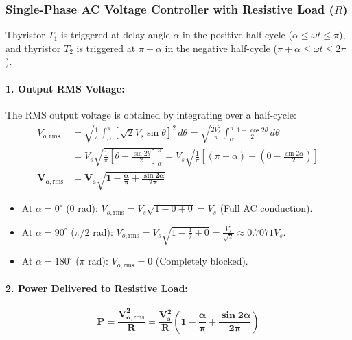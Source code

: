 \subsubsection{Single-Phase AC Voltage Controller with Resistive Load ($R$)}
Thyristor $T_1$ is triggered at delay angle $\alpha$ in the positive half-cycle ($\alpha \le \omega t \le \pi$), and thyristor $T_2$ is triggered at $\pi + \alpha$ in the negative half-cycle ($\pi + \alpha \le \omega t \le 2\pi$).

\paragraph{1. Output RMS Voltage:}
The RMS output voltage is obtained by integrating over a half-cycle:
\begin{align}
V_{o,\mathrm{rms}} &= \sqrt{\frac{1}{\pi} \int_\alpha^\pi \left[\sqrt{2} V_s \sin\theta\right]^2\,d\theta} = \sqrt{\frac{2 V_s^2}{\pi} \int_\alpha^\pi \frac{1 - \cos 2\theta}{2}\,d\theta} \nonumber \\
&= V_s \sqrt{\frac{1}{\pi} \left[ \theta - \frac{\sin 2\theta}{2} \right]_\alpha^\pi} = V_s \sqrt{\frac{1}{\pi} \left[ (\pi - \alpha) - \left(0 - \frac{\sin 2\alpha}{2}\right) \right]} \nonumber \\
\label{eq:ac_ac_vrms}
\mathbf{V_{o,\mathrm{rms}}} &\mathbf{= V_s \sqrt{1 - \frac{\alpha}{\pi} + \frac{\sin 2\alpha}{2\pi}}}
\end{align}
\begin{itemize}
  \item At $\alpha = 0^\circ$ ($0$ rad): $V_{o,\mathrm{rms}} = V_s \sqrt{1 - 0 + 0} = V_s$ (Full AC conduction).
  \item At $\alpha = 90^\circ$ ($\pi/2$ rad): $V_{o,\mathrm{rms}} = V_s \sqrt{1 - \frac{1}{2} + 0} = \frac{V_s}{\sqrt{2}} \approx 0.7071 V_s$.
  \item At $\alpha = 180^\circ$ ($\pi$ rad): $V_{o,\mathrm{rms}} = 0$ (Completely blocked).
\end{itemize}

\paragraph{2. Power Delivered to Resistive Load:}
\begin{equation}
\label{eq:ac_ac_power}
\mathbf{P = \frac{V_{o,\mathrm{rms}}^2}{R} = \frac{V_s^2}{R} \left(1 - \frac{\alpha}{\pi} + \frac{\sin 2\alpha}{2\pi}\right)}
\end{equation}

